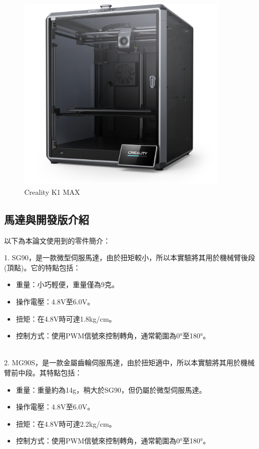 \documentclass[class=NCU_thesis, crop=false]{standalone}
\begin{document}
\begin{figure}[htbp]
    \centering
    \includegraphics[width=0.9\textwidth]{figures/creality-k1-max.png}
\caption{Creality K1 MAX}
\end{figure}

\subsection{馬達與開發版介紹}
以下為本論文使用到的零件簡介：

1. SG90，是一款微型伺服馬達，由於扭矩較小，所以本實驗將其用於機械臂後段(頂點)。它的特點包括：
\begin{itemize}
	\item 重量：小巧輕便，重量僅為9克。
	\item 操作電壓：4.8V至6.0V。
	\item 扭矩：在4.8V時可達1.8kg/cm。
	\item 控制方式：使用PWM信號來控制轉角，通常範圍為0°至180°。
\end{itemize}\\

2. MG90S，是一款金屬齒輪伺服馬達，由於扭矩適中，所以本實驗將其用於機械臂前中段。其特點包括：
\begin{itemize}
	\item 重量：重量約為14g，稍大於SG90，但仍屬於微型伺服馬達。
	\item 操作電壓：4.8V至6.0V。
	\item 扭矩：在4.8V時可達2.2kg/cm。
	\item 控制方式：使用PWM信號來控制轉角，通常範圍為0°至180°。
\end{itemize}\\
\end{document}
